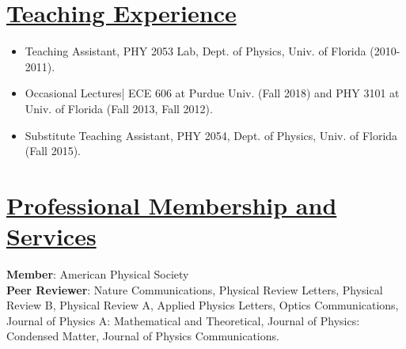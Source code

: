 \documentclass[12pt]{article}
\providecommand*\email[1]{\href{mailto:#1}{#1}}
\begin{document}
\vspace{-0.1in}
\section*{\underline{Teaching Experience}}
\begin{itemize}
\item Teaching Assistant, PHY 2053 Lab, Dept. of Physics, Univ. of Florida (2010-2011).
\item Occasional Lectures| ECE 606 at Purdue Univ. (Fall 2018) and PHY 3101 at Univ. of Florida (Fall 2013, Fall 2012).
\item Substitute Teaching Assistant, PHY 2054, Dept. of Physics, Univ. of Florida (Fall 2015).
\end{itemize}

\vspace{-0.1in}
 \section*{\underline{Professional Membership and Services}} 
\textbf{Member}: American Physical Society \\
\textbf{Peer Reviewer}: Nature Communications, Physical Review Letters, Physical Review B, Physical Review A, Applied Physics Letters, Optics Communications, Journal of Physics A: Mathematical and Theoretical, Journal of Physics: Condensed Matter, Journal of Physics Communications.
 
 
\end{document}
